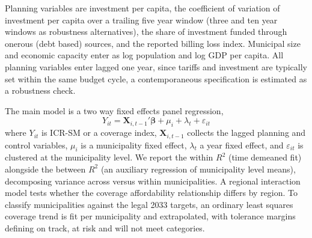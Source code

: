 \documentclass[preprint,12pt]{elsarticle}
\begin{document}
Planning variables are investment per capita, the coefficient of variation of investment per capita over a trailing five year window (three and ten year windows as robustness alternatives), the share of investment funded through onerous (debt based) sources, and the reported billing loss index. Municipal size and economic capacity enter as log population and log GDP per capita. All planning variables enter lagged one year, since tariffs and investment are typically set within the same budget cycle, a contemporaneous specification is estimated as a robustness check.

The main model is a two way fixed effects panel regression,
\begin{equation}
Y_{it} = \mathbf{X}_{i,t-1}' \boldsymbol{\beta} + \mu_i + \lambda_t + \varepsilon_{it}
\label{eq_panel}
\end{equation}
where $Y_{it}$ is ICR-SM or a coverage index, $\mathbf{X}_{i,t-1}$ collects the lagged planning and control variables, $\mu_i$ is a municipality fixed effect, $\lambda_t$ a year fixed effect, and $\varepsilon_{it}$ is clustered at the municipality level. We report the within $R^2$ (time demeaned fit) alongside the between $R^2$ (an auxiliary regression of municipality level means), decomposing variance across versus within municipalities. A regional interaction model tests whether the coverage affordability relationship differs by region. To classify municipalities against the legal 2033 targets, an ordinary least squares coverage trend is fit per municipality and extrapolated, with tolerance margins defining on track, at risk and will not meet categories.
\end{document}
